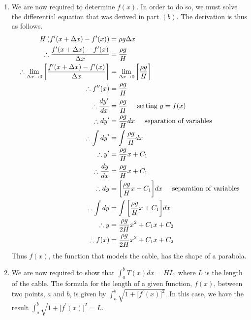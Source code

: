 \documentclass[a4paper]{article}
\begin{document}
\begin{enumerate}[label=\textbf{\arabic*.}]
\begin{enumerate}
		\item We are now required to determine $\displaystyle{f(x)}$. In order to do so, we must solve the differential equation that was derived in part $\displaystyle{(b)}$. The derivation is thus as follows.
		\begin{align*}
		H\left(f^{\prime}(x+\Delta x) - f^{\prime}(x) \right) & = \rho g \Delta x\\
		\therefore \frac{f^{\prime}(x+\Delta x) - f^{\prime}(x)}{\Delta x} & = \frac{\rho g}{H}\\
		\therefore \lim_{\Delta x \to 0} \left[\frac{f^{\prime}(x+\Delta x) - f^{\prime}(x)}{\Delta x}\right] & = \lim_{\Delta x \to 0} \bigg[\frac{\rho g}{H}\bigg]\\
		\therefore f^{\prime \prime}(x) & = \frac{\rho g}{H}\\
		\therefore \frac{dy^{\prime}}{dx} & = \frac{\rho g}{H} \hspace{5mm} \text{setting $\displaystyle{y = f(x)}$}\\
		\therefore dy^{\prime} & = \frac{\rho g}{H}dx \hspace{5mm} \text{separation of variables}\\
		\therefore \int dy^{\prime} & = \int \frac{\rho g}{H}dx\\
		\therefore y^{\prime} & = \frac{\rho g}{H}x + C_1\\
		\therefore \frac{dy}{dx} & = \frac{\rho g}{H}x + C_1\\
		\therefore dy & = \bigg[\frac{\rho g}{H}x + C_1\bigg]dx \hspace{5mm} \text{separation of variables}\\
		\therefore \int dy & = \int \bigg[\frac{\rho g}{H}x + C_1\bigg]dx\\
		\therefore y & = \frac{\rho g}{2H}x^2 + C_1x + C_2\\
		\therefore f(x) & = \frac{\rho g}{2H}x^2 + C_1x + C_2\\
		\end{align*}
		Thus $\displaystyle{f(x)}$, the function that models the cable, has the shape of a parabola.

		\bigbreak

		\item We are now required to show that $\displaystyle{\int^{b}_{a}T(x)dx = HL}$, where $\displaystyle{L}$ is the length of the cable. The formula for the length of a given function, $\displaystyle{f(x)}$, between two points, $\displaystyle{a}$ and $\displaystyle{b}$, is given by $\displaystyle{\int^{b}_{a}\sqrt{1 + \big[f^{\prime}(x)\big]^2}}$. In this case, we have the result $\displaystyle{\int^{b}_{a}\sqrt{1 + \big[f^{\prime}(x)\big]^2} = L}$.


\end{enumerate}
\end{enumerate}
\end{document}

